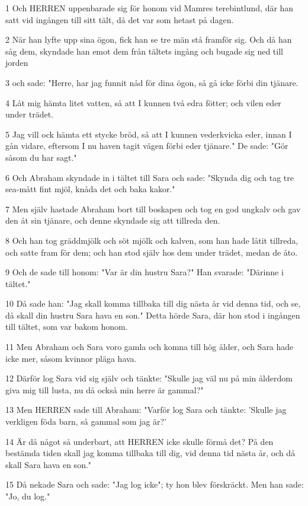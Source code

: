 \par 1 Och HERREN uppenbarade sig för honom vid Mamres terebintlund, där han satt vid ingången till sitt tält, då det var som hetast på dagen.
\par 2 När han lyfte upp sina ögon, fick han se tre män stå framför sig. Och då han såg dem, skyndade han emot dem från tältets ingång och bugade sig ned till jorden
\par 3 och sade: "Herre, har jag funnit nåd för dina ögon, så gå icke förbi din tjänare.
\par 4 Låt mig hämta litet vatten, så att I kunnen två edra fötter; och vilen eder under trädet.
\par 5 Jag vill ock hämta ett stycke bröd, så att I kunnen vederkvicka eder, innan I gån vidare, eftersom I nu haven tagit vägen förbi eder tjänare." De sade: "Gör såsom du har sagt."
\par 6 Och Abraham skyndade in i tältet till Sara och sade: "Skynda dig och tag tre sea-mått fint mjöl, knåda det och baka kakor."
\par 7 Men själv hastade Abraham bort till boskapen och tog en god ungkalv och gav den åt sin tjänare, och denne skyndade sig att tillreda den.
\par 8 Och han tog gräddmjölk och söt mjölk och kalven, som han hade låtit tillreda, och satte fram för dem; och han stod själv hos dem under trädet, medan de åto.
\par 9 Och de sade till honom: "Var är din hustru Sara?" Han svarade: "Därinne i tältet."
\par 10 Då sade han: "Jag skall komma tillbaka till dig nästa år vid denna tid, och se, då skall din hustru Sara hava en son." Detta hörde Sara, där hon stod i ingången till tältet, som var bakom honom.
\par 11 Men Abraham och Sara voro gamla och komna till hög ålder, och Sara hade icke mer, såsom kvinnor pläga hava.
\par 12 Därför log Sara vid sig själv och tänkte: "Skulle jag väl nu på min ålderdom giva mig till lusta, nu då också min herre är gammal?"
\par 13 Men HERREN sade till Abraham: "Varför log Sara och tänkte: 'Skulle jag verkligen föda barn, så gammal som jag är?'
\par 14 Är då något så underbart, att HERREN icke skulle förmå det? På den bestämda tiden skall jag komma tillbaka till dig, vid denna tid nästa år, och då skall Sara hava en son."
\par 15 Då nekade Sara och sade: "Jag log icke"; ty hon blev förskräckt. Men han sade: "Jo, du log."
